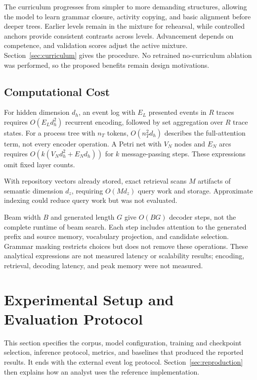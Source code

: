 \documentclass[mathematics,article,submit,moreauthors]{Definitions/mdpi}
\begin{document}
The curriculum progresses from simpler to more demanding structures, allowing the model to learn grammar closure, activity copying, and basic alignment before deeper trees. Earlier levels remain in the mixture for rehearsal, while controlled anchors provide consistent contrasts across levels. Advancement depends on competence, and validation scores adjust the active mixture. Section~\ref{sec:curriculum} gives the procedure. No retrained no-curriculum ablation was performed, so the proposed benefits remain design motivations.

\subsection{Computational Cost}\label{sec:complexity}

For hidden dimension $d_h$, an event log with $E_L$ presented events in $R$ traces requires $O(E_Ld_h^2)$ recurrent encoding, followed by set aggregation over $R$ trace states. For a process tree with $n_T$ tokens, $O(n_T^2d_h)$ describes the full-attention term, not every encoder operation. A Petri net with $V_N$ nodes and $E_N$ arcs requires $O\!\left(k(V_Nd_h^2+E_Nd_h)\right)$ for $k$ message-passing steps. These expressions omit fixed layer counts.

With repository vectors already stored, exact retrieval scans $M$ artifacts of semantic dimension $d_z$, requiring $O(Md_z)$ query work and storage. Approximate indexing could reduce query work but was not evaluated.

Beam width $B$ and generated length $G$ give $O(BG)$ decoder steps, not the complete runtime of beam search. Each step includes attention to the generated prefix and source memory, vocabulary projection, and candidate selection. Grammar masking restricts choices but does not remove these operations. These analytical expressions are not measured latency or scalability results; encoding, retrieval, decoding latency, and peak memory were not measured.

\FloatBarrier
\section{Experimental Setup and Evaluation Protocol}\label{sec:experiment}

This section specifies the corpus, model configuration, training and checkpoint selection, inference protocol, metrics, and baselines that produced the reported results. It ends with the external event log protocol. Section~\ref{sec:reproduction} then explains how an analyst uses the reference implementation.
\end{document}
